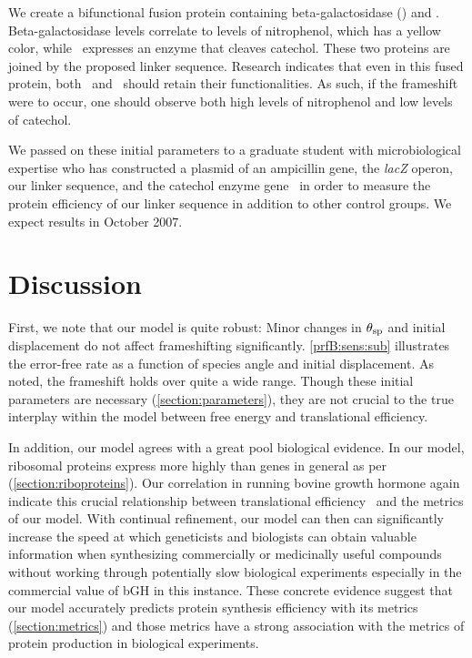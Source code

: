\documentclass[12pt]{article}
\numberwithin{equation}{section}
\begin{document}
We create a bifunctional fusion protein containing beta-galactosidase (\bgals) 
and \xylE.  Beta-galactosidase levels correlate to
levels of nitrophenol, which has a yellow color, while \xylE\ expresses
an enzyme that cleaves catechol.  These two proteins are joined by
the proposed linker sequence.  Research indicates that even in this
fused protein, both \bgals\ and \xylE\ should retain their functionalities.
As such, if the frameshift were to occur, one should observe both 
high levels of nitrophenol and low levels of catechol.

We passed on these initial parameters to a graduate student with
microbiological expertise who has constructed a plasmid of an
ampicillin gene, the \emph{lacZ} operon, our linker sequence, and the
catechol enzyme gene \xylE\ in order to measure the protein
efficiency of our linker sequence in addition to other control
groups. We expect results in October 2007.

\section{Discussion}
First, we note that our model is quite robust: Minor changes
in $\theta_{\rm{sp}}$ and initial displacement do not affect
frameshifting significantly.
\autoref{prfB:sens:sub} illustrates the error-free rate as
a function of species angle and initial displacement. As noted,
the frameshift holds over quite a wide range. Though these initial
parameters are necessary (\autoref{section:parameters}), they are not
crucial to the true interplay within the model between free energy and
translational efficiency.

In addition, our model agrees with a great pool biological
evidence. In our model, ribosomal proteins express more highly than
genes in general as per \citet{rpoS:process}
(\autoref{section:riboproteins}).  Our correlation in running bovine
growth hormone again indicate this crucial relationship between
translational efficiency~\cite{schoner:bgh} and the metrics of our
model. With continual refinement, our model can then can significantly
increase the speed at which geneticists and biologists can obtain
valuable information when synthesizing commercially or medicinally
useful compounds without working through potentially slow biological
experiments especially in the commercial value of bGH in this
instance.  These concrete evidence suggest that our model
accurately predicts protein synthesis efficiency with its metrics
(\autoref{section:metrics}) and those metrics have a strong
association with the metrics of protein production in biological experiments.
\end{document}
